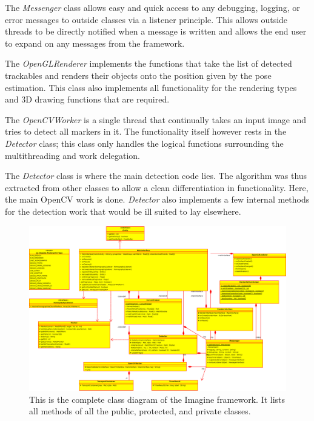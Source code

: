 The \textit{Messenger} class allows easy and quick access to any debugging, logging, or error messages to outside classes via a listener principle.
This allows outside threads to be directly notified when a message is written and allows the end user to expand on any messages from the framework.

The \textit{OpenGLRenderer} implements the functions that take the list of detected trackables and renders their objects onto the position given by the pose estimation.
This class also implements all functionality for the rendering types and 3D drawing functions that are required.

The \textit{OpenCVWorker} is a single thread that continually takes an input image and tries to detect all markers in it.
The functionality itself however rests in the \textit{Detector} class; this class only handles the logical functions surrounding the multithreading and work delegation.

The \textit{Detector} class is where the main detection code lies.
The algorithm was thus extracted from other classes to allow a clean differentiation in functionality.
Here, the main OpenCV work is done.
\textit{Detector} also implements a few internal methods for the detection work that would be ill suited to lay elsewhere.

\begin{figure}
	\centering
	\includegraphics[width=21cm]{img/complete_class_diagram.eps}
	\caption[Complete Class Diagram]{This is the complete class diagram of the Imagine framework. It lists all methods of all the public, protected, and private classes.}
	\label{fig:complete_class_diagram}
\end{figure}


